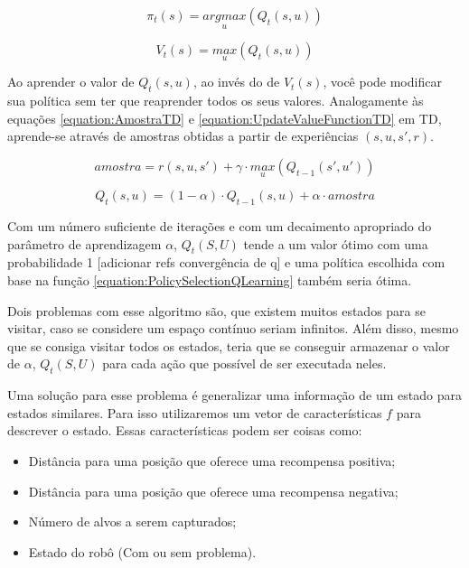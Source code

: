 \begin{equation} \label{equation:PolicySelectionQLearning}
    \pi_t \left( s \right) = \underset{u}{argmax} \left( Q_t \left( s, u \right) \right)
\end{equation}

\begin{equation}
    V_t \left( s \right) = \underset{u}{max} \left( Q_t \left( s, u \right) \right)
\end{equation}

Ao aprender o valor de $ Q_t \left( s, u \right) $, ao invés do de $ V_t \left( s \right) $, você pode modificar sua política sem ter que reaprender todos os seus valores. Analogamente às equações \ref{equation:AmostraTD} e \ref{equation:UpdateValueFunctionTD} em TD, aprende-se através de amostras obtidas a partir de experiências $ \left( s, u, s', r \right) $.


\begin{equation}
	amostra = r \left( s, u, s' \right) + \gamma \cdot \underset{u}{max} \left( Q_{t-1} \left( s', u' \right) \right)
\end{equation}

\begin{equation}
	Q_t \left( s, u \right) = \left( 1 - \alpha \right) \cdot Q_{t-1} \left( s, u \right) + \alpha \cdot amostra
\end{equation}

Com um número suficiente de iterações e com um decaimento apropriado do parâmetro de aprendizagem $ \alpha $, $ Q_t \left( S, U \right) $ tende a um valor ótimo  com uma probabilidade 1 [adicionar refs convergência de q] e uma política escolhida com base na função \ref{equation:PolicySelectionQLearning} também seria ótima.

Dois problemas com esse algoritmo são, que existem muitos estados para se visitar, caso se considere um espaço contínuo seriam infinitos. Além disso, mesmo que se consiga visitar todos os estados, teria que se conseguir armazenar o valor de $ \alpha $, $ Q_t \left( S, U \right) $ para cada ação que possível de ser executada neles.

Uma solução para esse problema é generalizar uma informação de um estado para estados similares. Para isso utilizaremos um vetor de características $ f $ para descrever o estado. Essas características podem ser coisas como:

\begin{itemize}
	\item Distância para uma posição que oferece uma recompensa positiva;
	\item Distância para uma posição que oferece uma recompensa negativa;
	\item Número de alvos a serem capturados;
	\item Estado do robô (Com ou sem problema).
\end{itemize}

